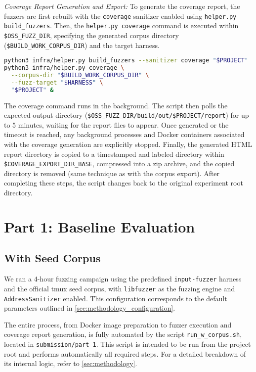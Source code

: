 \documentclass[11pt,a4paper,twocolumn]{article}
\begin{document}
\emph{Coverage Report Generation and Export:} To generate the coverage report, the fuzzers are first rebuilt with the \texttt{coverage} sanitizer enabled using \texttt{helper.py build\_fuzzers}. Then, the \texttt{helper.py coverage} command is executed within \texttt{\$OSS\_FUZZ\_DIR}, specifying the generated corpus directory (\texttt{\$BUILD\_WORK\_CORPUS\_DIR}) and the target harness.

\begin{lstlisting}[language=bash, caption=Bash commands to rebuild with coverage and generate report]
python3 infra/helper.py build_fuzzers --sanitizer coverage "$PROJECT"
python3 infra/helper.py coverage \
  --corpus-dir "$BUILD_WORK_CORPUS_DIR" \
  --fuzz-target "$HARNESS" \
  "$PROJECT" &
\end{lstlisting}
The coverage command runs in the background. The script then polls the expected output directory (\texttt{\$OSS\_FUZZ\_DIR/build/out/\$PROJECT/report}) for up to 5 minutes, waiting for the report files to appear. Once generated or the timeout is reached, any background processes and Docker containers associated with the coverage generation are explicitly stopped. Finally, the generated HTML report directory is copied to a timestamped and labeled directory within \texttt{\$COVERAGE\_EXPORT\_DIR\_BASE}, compressed into a zip archive, and the copied directory is removed (same technique as with the corpus export). After completing these steps, the script changes back to the original experiment root directory.

\section*{Part 1: Baseline Evaluation}

\subsection*{With Seed Corpus} \label{sec:with-seed}

We ran a 4-hour fuzzing campaign using the predefined \texttt{input-fuzzer} harness and the official tmux seed corpus, with \texttt{libfuzzer} as the fuzzing engine and \texttt{AddressSanitizer} enabled. This configuration corresponds to the default parameters outlined in \autoref{sec:methodology_configuration}.

The entire process, from Docker image preparation to fuzzer execution and coverage report generation, is fully automated by the script \texttt{run\_w\_corpus.sh}, located in \texttt{submission/part\_1}. This script is intended to be run from the project root and performs automatically all required steps. For a detailed breakdown of its internal logic, refer to \autoref{sec:methodology}.
\end{document}
